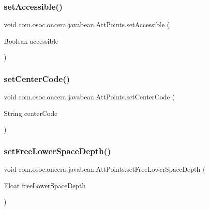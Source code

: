 \subsubsection{\texorpdfstring{setAccessible()}{setAccessible()}}
{\footnotesize\ttfamily void com.\+osoc.\+oncera.\+javabean.\+Att\+Points.\+set\+Accessible (\begin{DoxyParamCaption}\item[{Boolean}]{accessible }\end{DoxyParamCaption})}

\mbox{\label{classcom_1_1osoc_1_1oncera_1_1javabean_1_1_att_points_a0a796c44dc6e5d7f5f761436366fc291}} 
\subsubsection{\texorpdfstring{setCenterCode()}{setCenterCode()}}
{\footnotesize\ttfamily void com.\+osoc.\+oncera.\+javabean.\+Att\+Points.\+set\+Center\+Code (\begin{DoxyParamCaption}\item[{String}]{center\+Code }\end{DoxyParamCaption})}

\mbox{\label{classcom_1_1osoc_1_1oncera_1_1javabean_1_1_att_points_a4377af2cb6d49209d9af481e98e75352}} 
\subsubsection{\texorpdfstring{setFreeLowerSpaceDepth()}{setFreeLowerSpaceDepth()}}
{\footnotesize\ttfamily void com.\+osoc.\+oncera.\+javabean.\+Att\+Points.\+set\+Free\+Lower\+Space\+Depth (\begin{DoxyParamCaption}\item[{Float}]{free\+Lower\+Space\+Depth }\end{DoxyParamCaption})}

